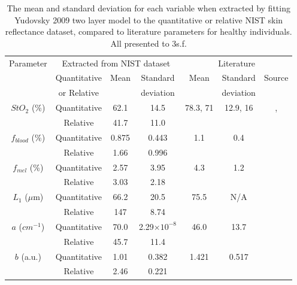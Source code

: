 \begin{table}[h]
    \centering
    \caption{The mean and standard deviation for each variable when extracted by fitting Yudovsky 2009 two layer model to the quantitative or relative NIST skin reflectance dataset, compared to literature parameters for healthy individuals. All presented to 3s.f.}
    \begin{tabular}{|c|ccc|ccc|}
        \hline
        \multirow{2}{*}{Parameter} & \multicolumn{3}{c}{Extracted from NIST dataset} & \multicolumn{3}{|c|}{Literature} \\
        \cline{2-7}
         & Quantitative & \multirow{2}{*}{Mean} & Standard & \multirow{2}{*}{Mean} & Standard & \multirow{2}{*}{Source} \\
         & or Relative &  & deviation &  & deviation &  \\
        \hline
        \multirow{2}{*}{$StO_2$ (\%)} & Quantitative & 62.1 & 14.5 & \multirow{2}{*}{78.3, 71} & \multirow{2}{*}{12.9, 16} & \multirow{2}{*}{\cite{VanManen2021}, \cite{Nishidate2011}} \\ %
        & Relative & 41.7 & 11.0 & & & \\ %
        \hline
        $f_{blood}$ (\%) & Quantitative & 0.875 & 0.443 & \multirow{2}{*}{1.1} & \multirow{2}{*}{0.4} & \multirow{2}{*}{\cite{Nishidate2011}} \\ %
        & Relative & 1.66 & 0.996 & & & \\
        \hline
        $f_{mel}$ (\%) & Quantitative & 2.57 & 3.95 & \multirow{2}{*}{4.3} & \multirow{2}{*}{1.2} & \multirow{2}{*}{\cite{Nishidate2011}} \\ %
        & Relative & 3.03 & 2.18 & & &  \\
        \hline
        $L_1$ ($\mu$m) & Quantitative & 66.2 & 20.5 & \multirow{2}{*}{75.5} & \multirow{2}{*}{N/A} & \multirow{2}{*}{\cite{Lintzeri2022}} \\ %
        & Relative & 147 & 8.74 & & &  \\
        \hline
        $a$ (\textrm{$cm^{-1}$}) & Quantitative & 70.0 & 2.29$\times 10^{-8}$ & \multirow{2}{*}{46.0} & \multirow{2}{*}{13.7} & \multirow{2}{*}{\cite{Jacques2013}} \\ %
        & Relative & 45.7 & 11.4 & & &  \\
        \hline
        $b$ (a.u.) & Quantitative & 1.01 & 0.382 & \multirow{2}{*}{1.421} & \multirow{2}{*}{0.517} & \multirow{2}{*}{\cite{Jacques2013}} \\ %
        & Relative & 2.46 & 0.221 & & &  \\
        \hline
    \end{tabular}
    \label{tb:NISTparamsuniform}
\end{table}

